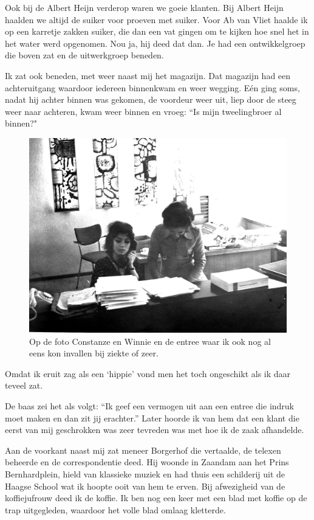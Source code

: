 \documentclass[10pt,twoside, openright]{memoir}
\begin{document}
Ook bij de Albert Heijn verderop waren we goeie klanten. Bij Albert Heijn haalden we altijd de suiker voor proeven met suiker. Voor Ab van Vliet haalde ik op een karretje zakken suiker, die dan een vat gingen om te kijken hoe snel het in het water werd opgenomen. Nou ja, hij deed dat dan. Je had een ontwikkelgroep die boven zat en de uitwerkgroep beneden. 

Ik zat ook beneden, met weer naast mij het magazijn. Dat magazijn had een achteruitgang waardoor iedereen binnenkwam en weer wegging. Eén ging soms, nadat hij achter binnen was gekomen, de voordeur weer uit, liep door de steeg weer naar achteren, kwam weer binnen en vroeg: ``Is mijn tweelingbroer al binnen?"

\begin{figure}[t]
\includegraphics[width=\textwidth]{img/ch40/molenvd}
\caption*{\footnotesize Op de foto Constanze en Winnie en de entree waar ik ook nog al eens kon invallen bij ziekte of zeer.}
\end{figure}

Omdat ik eruit zag als een `hippie' vond men het toch ongeschikt als ik daar teveel zat.

De baas zei het als volgt: ``Ik geef een vermogen uit aan een entree die indruk moet maken en dan zit jij erachter.'' Later hoorde ik van hem dat een klant die eerst van mij geschrokken was zeer tevreden was met hoe ik de zaak afhandelde.

Aan de voorkant naast mij zat meneer Borgerhof die vertaalde, de telexen beheerde en de correspondentie deed. Hij woonde in Zaandam aan het Prins Bernhardplein, hield van klassieke muziek en had thuis een schilderij uit de Haagse School wat ik hoopte ooit van hem te erven. Bij afwezigheid van de koffiejufrouw deed ik de koffie. Ik ben nog een keer met een blad met koffie op de trap uitgegleden, waardoor het volle blad omlaag kletterde.
\end{document}
